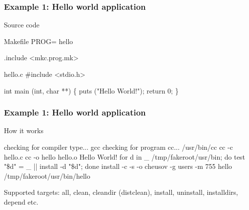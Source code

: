 \documentclass[hyperref={colorlinks=true}]{beamer}
\begin{document}
\begin{frame}[fragile]
  \frametitle{Example 1: Hello world application}

  \begin{block}{Source code}


      \begin{Code}{Makefile}
PROG=      hello

.include <mkc.prog.mk>
      \end{Code}

      \begin{Code}{hello.c}
#include <stdio.h>

int main (int, char **)
\{
   puts ("Hello World!");
   return 0;
\}
      \end{Code}
  \end{block}
\end{frame}

\begin{frame}[fragile]
  \frametitle{Example 1: Hello world application}

\begin{block}{How it works}
\begin{CodeNoLabel}
checking for compiler type... gcc
checking for program cc... /usr/bin/cc
cc     -c hello.c
cc   -o hello hello.o
Hello World!
for d in \_ /tmp/fakeroot/usr/bin; do  test "\$d" = \_ ||
   install -d "\$d";  done
install   -c -s  -o cheusov -g users -m 755
   hello /tmp/fakeroot/usr/bin/hello
\prompt{\$}
\end{CodeNoLabel}
\end{block}
Supported targets: all, clean, cleandir (distclean), install,
uninstall, installdirs, depend etc.
\end{frame}
\end{document}
